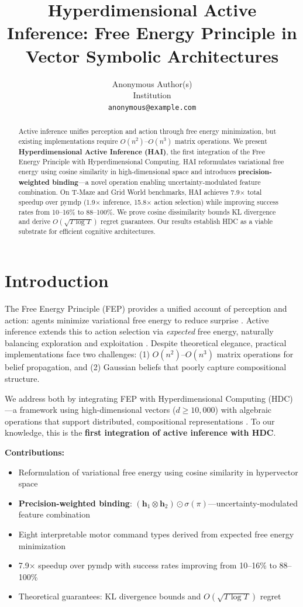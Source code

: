 \documentclass{article}
\title{Hyperdimensional Active Inference: Free Energy Principle in Vector Symbolic Architectures}
\author{%
  Anonymous Author(s) \\
  Institution \\
  \texttt{anonymous@example.com}
}
\begin{document}
\maketitle

\begin{abstract}
Active inference unifies perception and action through free energy minimization, but existing implementations require $O(n^2)$--$O(n^3)$ matrix operations. We present \textbf{Hyperdimensional Active Inference (HAI)}, the first integration of the Free Energy Principle with Hyperdimensional Computing. HAI reformulates variational free energy using cosine similarity in high-dimensional space and introduces \textbf{precision-weighted binding}---a novel operation enabling uncertainty-modulated feature combination. On T-Maze and Grid World benchmarks, HAI achieves 7.9$\times$ total speedup over pymdp (1.9$\times$ inference, 15.8$\times$ action selection) while improving success rates from 10--16\% to 88--100\%. We prove cosine dissimilarity bounds KL divergence and derive $O(\sqrt{T \log T})$ regret guarantees. Our results establish HDC as a viable substrate for efficient cognitive architectures.
\end{abstract}

\section{Introduction}

The Free Energy Principle (FEP) provides a unified account of perception and action: agents minimize variational free energy to reduce surprise \citep{friston2010free}. Active inference extends this to action selection via \emph{expected} free energy, naturally balancing exploration and exploitation \citep{friston2017active}. Despite theoretical elegance, practical implementations face two challenges: (1) $O(n^2)$--$O(n^3)$ matrix operations for belief propagation, and (2) Gaussian beliefs that poorly capture compositional structure.

We address both by integrating FEP with Hyperdimensional Computing (HDC)---a framework using high-dimensional vectors ($d \geq 10{,}000$) with algebraic operations that support distributed, compositional representations \citep{kanerva2009hyperdimensional}. To our knowledge, this is the \textbf{first integration of active inference with HDC}.

\textbf{Contributions:}
\begin{itemize}
    \item Reformulation of variational free energy using cosine similarity in hypervector space
    \item \textbf{Precision-weighted binding}: $(\mathbf{h}_1 \otimes \mathbf{h}_2) \odot \sigma(\pi)$---uncertainty-modulated feature combination
    \item Eight interpretable motor command types derived from expected free energy minimization
    \item 7.9$\times$ speedup over pymdp with success rates improving from 10--16\% to 88--100\%
    \item Theoretical guarantees: KL divergence bounds and $O(\sqrt{T \log T})$ regret
\end{itemize}
\end{document}

